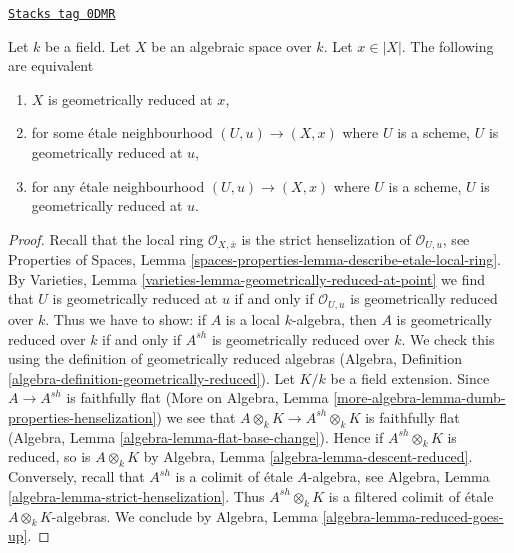 \begin{lemma}
\label{spaces-over-fields-lemma-geometrically-reduced-at-point}
\href{https://stacks.math.columbia.edu/tag/0DMR}{\texttt{Stacks tag 0DMR}}

Let $k$ be a field. Let $X$ be an algebraic space over $k$.
Let $x \in |X|$. The following are equivalent
\begin{enumerate}
\item $X$ is geometrically reduced at $x$,
\item for some \'etale neighbourhood $(U, u) \to (X, x)$
where $U$ is a scheme, $U$ is geometrically reduced at $u$,
\item for any \'etale neighbourhood $(U, u) \to (X, x)$
where $U$ is a scheme, $U$ is geometrically reduced at $u$.
\end{enumerate}
\end{lemma}

\begin{proof}
Recall that the local ring $\mathcal{O}_{X, \overline{x}}$
is the strict henselization of $\mathcal{O}_{U, u}$, see
Properties of Spaces, Lemma
\ref{spaces-properties-lemma-describe-etale-local-ring}.
By Varieties, Lemma \ref{varieties-lemma-geometrically-reduced-at-point}
we find that $U$ is geometrically reduced at $u$ if and only
if $\mathcal{O}_{U, u}$ is geometrically reduced over $k$.
Thus we have to show: if $A$ is a local $k$-algebra, then
$A$ is geometrically reduced over $k$ if and only if
$A^{sh}$ is geometrically reduced over $k$.
We check this using the definition of geometrically reduced
algebras (Algebra, Definition \ref{algebra-definition-geometrically-reduced}).
Let $K/k$ be a field extension.
Since $A \to A^{sh}$ is faithfully flat
(More on Algebra, Lemma \ref{more-algebra-lemma-dumb-properties-henselization})
we see that
$A \otimes_k K \to A^{sh} \otimes_k K$ is faithfully flat
(Algebra, Lemma \ref{algebra-lemma-flat-base-change}).
Hence if $A^{sh} \otimes_k K$ is reduced, so is
$A \otimes_k K$ by Algebra, Lemma \ref{algebra-lemma-descent-reduced}.
Conversely, recall that $A^{sh}$ is a colimit of
\'etale $A$-algebra, see
Algebra, Lemma \ref{algebra-lemma-strict-henselization}.
Thus $A^{sh} \otimes_k K$ is a filtered
colimit of \'etale $A \otimes_k K$-algebras.
We conclude by Algebra, Lemma \ref{algebra-lemma-reduced-goes-up}.
\end{proof}

